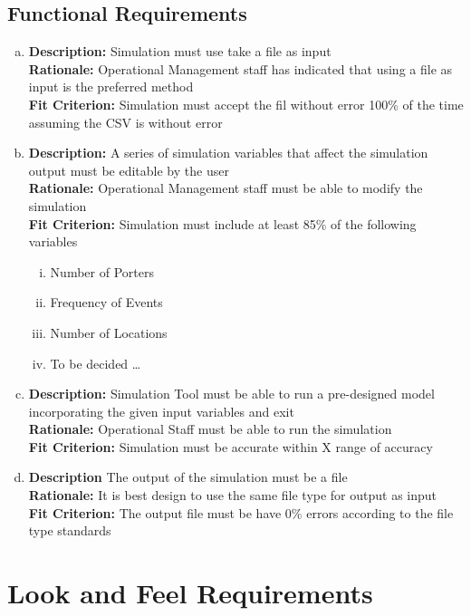 \documentclass[paper=letter, fontsize=10pt]{scrartcl}
\numberwithin{equation}{section}		%
\numberwithin{figure}{section}			%
\numberwithin{table}{section}				%
\begin{document}
\subsection{Functional Requirements}
\begin{enumerate}[(a)]
	\item \textbf{Description:} Simulation must use take a file as input
	\\ \textbf{Rationale:} Operational Management staff has indicated that using a file as input is the preferred method 
	\\ \textbf{Fit Criterion:} Simulation must accept the fil without error 100\% of the time assuming the CSV is without error
	\item \textbf{Description:} A series of simulation variables that affect the simulation output must be editable by the user
	\\ \textbf{Rationale:} Operational Management staff must be able to modify the simulation
	\\ \textbf{Fit Criterion:} Simulation must include at least 85\% of the following variables   
	\begin{enumerate}[(i)]
		\item Number of Porters
		\item Frequency of Events
		\item Number of Locations
		\item To be decided \ldots
	\end{enumerate}
	\item \textbf{Description:} Simulation Tool must be able to run a pre-designed model incorporating the given input variables and exit
	\\ \textbf{Rationale:} Operational Staff must be able to run the simulation
	\\ \textbf{Fit Criterion:} Simulation must be accurate within X range of accuracy 
	\item \textbf{Description} The output of the simulation must be a file
	\\ \textbf{Rationale:} It is best design to use the same file type for output as input
	\\ \textbf{Fit Criterion:} The output file must be have 0\% errors according to the file type standards 
\end{enumerate}

\section{Look and Feel Requirements}
\end{document}
